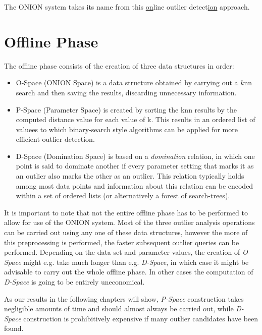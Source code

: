 \documentclass[runningheads]{llncs}
\begin{document}
The ONION system takes its name from this \underline{on}line outlier detect\underline{ion} approach.

\section{Offline Phase}

The offline phase consists of the creation of three data structures in order:

\begin{itemize}
 \item O-Space (ONION Space) is a data structure obtained by carrying out a $k$nn search and then saving the results, discarding unnecessary information.
 \item P-Space (Parameter Space) is created by sorting the knn results by the computed distance value for each value of k. This results in an ordered list of valuees to which binary-search style algorithms can be applied for more efficient outlier detection.
 \item D-Space (Domination Space) is based on a \emph{domination} relation, in which one point is said to dominate another if every parameter setting that marks it as an outlier also marks the other as an outlier. This relation typically holds among most data points and information about this relation can be encoded within a set of ordered lists (or alternatively a forest of search-trees).
\end{itemize}

It is important to note that not the entire offline phase has to be performed to allow for use of the ONION system. Most of the three outlier analysis operations can be carried out using any one of these data structures, however the more of this preprocessing is performed, the faster subsequent outlier queries can be performed. Depending on the data set and parameter values, the creation of \emph{O-Space} might e.g. take much longer than e.g. \emph{D-Space}, in which case it might be advisable to carry out the whole offline phase. In other cases the computation of \emph{D-Space} is going to be entirely uneconomical.

As our results in the following chapters will show, \emph{P-Space} construction takes negligible amounts of time and should almost always be carried out, while \emph{D-Space} construction is prohibitively expensive if many outlier candidates have been found.
\end{document}
